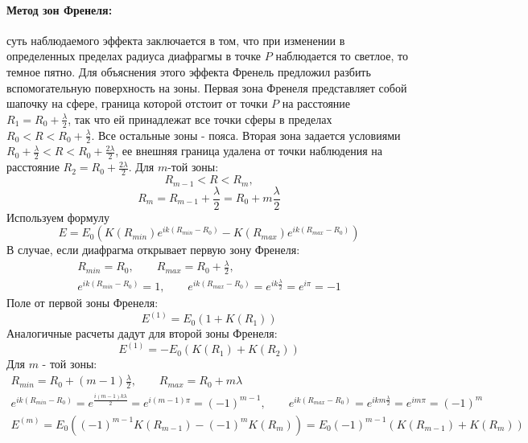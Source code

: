 \documentclass[__minimum__.tex]{subfiles}
\begin{document}
\paragraph{Метод зон Френеля:} суть наблюдаемого эффекта заключается в том, что при изменении в определенных пределах радиуса диафрагмы в точке $P$ наблюдается то светлое, то темное пятно. Для объяснения этого эффекта Френель предложил разбить вспомогательную поверхность на зоны. Первая зона Френеля представляет собой шапочку на сфере, граница которой отстоит от точки $P$ на расстояние $R_1 = R_0 + \frac{\lambda}{2}$, так что ей принадлежат все точки сферы в пределах $R_0 < R < R_0 + \frac{\lambda}{2}$. Все остальные зоны - пояса. Вторая зона задается условиями $R_0 + \frac{\lambda}{2} < R < R_0 + \frac{2\lambda}{2}$, ее внешняя граница удалена от точки наблюдения на расстояние $R_2 = R_0 + \frac{2\lambda}{2}$. Для $m$-той зоны:
$$
    R_{m-1} < R < R_m,
$$
$$
    R_m = R_{m-1} + \frac{\lambda}{2} = R_0 + m\frac{\lambda}{2}
$$
Используем формулу
$$
    E=E_0\left(K(R_{min}) e^{ik(R_{min} - R_0)} - K(R_{max})e^{ik(R_{max} - R_0)} \right)
$$
В случае, если диафрагма открывает первую зону Френеля:
\begin{gather*}
    R_{min} = R_0, \qquad R_{max} = R_0 + \frac{\lambda}{2} , \\
    e^{ik(R_{min} - R_0)} = 1, \qquad e^{ik(R_{max} - R_0)} = e^{ik\frac{\lambda}{2}} = e^{i\pi} = -1
\end{gather*}
Поле от первой зоны Френеля:
$$
    E^{(1)} = E_0(1 + K(R_1))
$$
Аналогичные расчеты дадут для второй зоны Френеля:
$$
    E^{(1)} = - E_0(K(R_1) + K(R_2))
$$
Для $m$ - той зоны:
\begin{gather*}
    R_{min} = R_0 + (m - 1)\frac{\lambda}{2}, \qquad R_{max} = R_0 + m\lambda \\
    e^{ik(R_{min} - R_0)} = e^{\frac{i(m-1)k\lambda}{2}} = e^{i(m-1)\pi} = (-1)^{m-1}, \qquad
    e^{ik(R_{max} - R_0)} = e^{ikm\frac{\lambda}{2}} = e^{im\pi} = (-1)^m\\
    E^{(m)} = E_0\left((-1)^{m-1} K(R_{m-1}) - (-1)^m K(R_m)\right) = E_0(-1)^{m-1} (K(R_{m-1}) + K(R_m))
\end{gather*}
\end{document}
